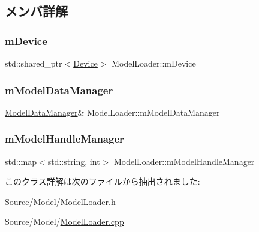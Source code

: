 \subsection{メンバ詳解}
\mbox{\label{class_model_loader_a2e5b33970d8a71e5851e3b51b7980fa8}} 
\subsubsection{\texorpdfstring{m\+Device}{mDevice}}
{\footnotesize\ttfamily std\+::shared\+\_\+ptr$<$\mbox{\hyperlink{class_device}{Device}}$>$ Model\+Loader\+::m\+Device\hspace{0.3cm}{\ttfamily [protected]}}

\mbox{\label{class_model_loader_a5877a5f2d2ec8db87cdcbf0a87c8587b}} 
\subsubsection{\texorpdfstring{m\+Model\+Data\+Manager}{mModelDataManager}}
{\footnotesize\ttfamily \mbox{\hyperlink{class_model_data_manager}{Model\+Data\+Manager}}\& Model\+Loader\+::m\+Model\+Data\+Manager\hspace{0.3cm}{\ttfamily [protected]}}

\mbox{\label{class_model_loader_a8d1002a30494635ec76972f3354f1ba9}} 
\subsubsection{\texorpdfstring{m\+Model\+Handle\+Manager}{mModelHandleManager}}
{\footnotesize\ttfamily std\+::map$<$std\+::string, int$>$ Model\+Loader\+::m\+Model\+Handle\+Manager\hspace{0.3cm}{\ttfamily [protected]}}



このクラス詳解は次のファイルから抽出されました\+:\begin{DoxyCompactItemize}
\item 
Source/\+Model/\mbox{\hyperlink{_model_loader_8h}{Model\+Loader.\+h}}\item 
Source/\+Model/\mbox{\hyperlink{_model_loader_8cpp}{Model\+Loader.\+cpp}}\end{DoxyCompactItemize}
